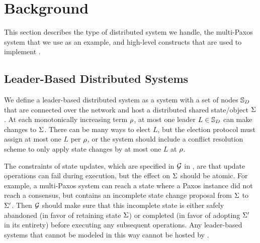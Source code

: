 \section{Background}
\label{sec:background}

This section describes the type of distributed system we handle,
the multi-Paxos system that we use as an example,
and high-level constructs that are used to implement \sysname{}.

\subsection{Leader-Based Distributed Systems}

%

We define a leader-based distributed system as a system with a set of nodes
$\mathbb{S}_{D}$ that are connected over the network and host a distributed shared state/object
$\Sigma$. At each monotonically increasing term $\rho$, at most one leader
$L \in \mathbb{S}_{D}$ can make changes to $\Sigma$. There can be many ways to elect
$L$, but the election protocol must assign at most one $L$ per $\rho$,
or the system should include a conflict resolution scheme to only apply
state changes by at most one $L$ at $\rho$.


The constraints of state updates, which are specified in $\mathcal{G}$ in
\sysname{},
are that
update operations can fail during execution, but the effect on $\Sigma$ should be
atomic. For example, a multi-Paxos system can reach a
state where a Paxos instance did not reach a consensus, but contains an
incomplete state change proposal from $\Sigma$ to $\Sigma^\prime$.
Then $\mathcal{G}$ should make sure that this
incomplete state is either safely abandoned (in favor of retaining state $\Sigma$)
or completed (in favor of adopting $\Sigma^\prime$ in its entirety)
before executing any subsequent
operations. Any leader-based systems that cannot be modeled in this way cannot
be hosted by \sysname{}.

